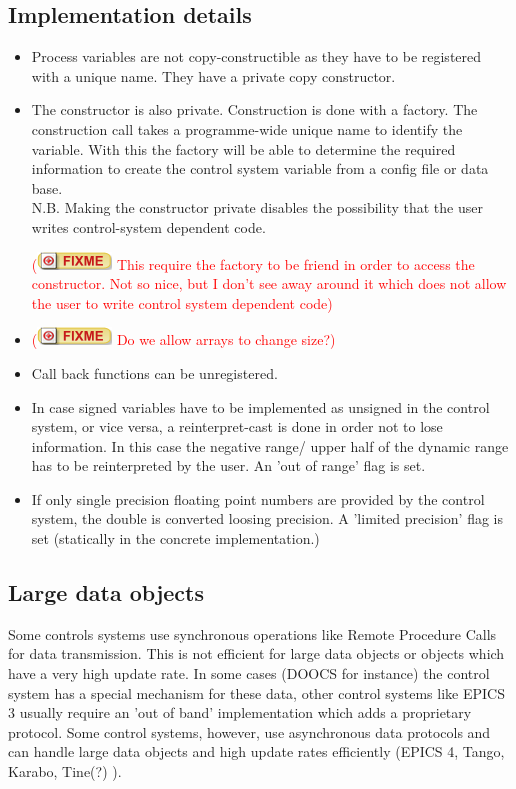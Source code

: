 \documentclass[11pt,a4paper]{scrartcl}
\newcounter{nFixmes}
\newcommand{\fixme}[1]{\addtocounter{nFixmes}{1}\textcolor{red}{(\includegraphics[height=2ex]{fixme} #1)}\xspace}
\begin{document}
\subsection{Implementation details}

\begin{itemize}
\item Process variables are not copy-constructible as they have to be
  registered with a unique name. They have a private copy constructor. 
\item The constructor is also private. Construction is done with a
  factory. The construction call takes a programme-wide unique name to
  identify the variable. With this the factory will be able to determine the
  required information to create the control system variable from a config
  file or data base.\\
N.B. Making the constructor private disables the possibility that the user
writes control-system dependent code. 
\fixme{This require the factory to be friend in order to access the
  constructor. Not so nice, but I don't see away around it which does not
  allow the user to write control system dependent code} 
\item \fixme{Do we allow arrays to change size?}
\item Call back functions can be unregistered.
\item In case signed variables have to be implemented as unsigned in the
  control system, or vice versa, a reinterpret-cast is done in order not to
  lose information. In this case the negative range/ upper half of the dynamic
  range has to be reinterpreted by the user. An 'out of range' flag is set. 
\item If only single precision floating point numbers are provided by the
  control system, the double is converted loosing precision. A 'limited
  precision' flag is set (statically in the concrete implementation.)
\end{itemize}

\subsection{Large data objects}

Some controls systems use synchronous operations like Remote Procedure Calls
for data transmission. This is not efficient for large data objects or objects
which have a very high update rate. In some cases (DOOCS for instance) the
control system has a special mechanism for these data, other control systems
like EPICS 3 usually require an 'out of band' implementation which adds a
proprietary protocol. Some control systems, however, use asynchronous data
protocols and can handle large data objects and high update rates efficiently
(EPICS 4, Tango, Karabo, Tine(?) ).
\end{document}
